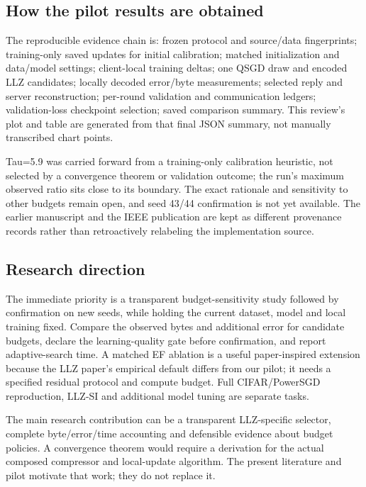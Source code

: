 \subsection*{How the pilot results are obtained}

The reproducible evidence chain is: frozen protocol and source/data fingerprints; training-only saved updates for initial calibration; matched initialization and data/model settings; client-local training deltas; one QSGD draw and encoded LLZ candidates; locally decoded error/byte measurements; selected reply and server reconstruction; per-round validation and communication ledgers; validation-loss checkpoint selection; saved comparison summary. This review's plot and table are generated from that final JSON summary, not manually transcribed chart points.

Tau=5.9 was carried forward from a training-only calibration heuristic, not selected by a convergence theorem or validation outcome; the run's maximum observed ratio sits close to its boundary. The exact rationale and sensitivity to other budgets remain open, and seed 43/44 confirmation is not yet available. The earlier manuscript and the IEEE publication are kept as different provenance records rather than retroactively relabeling the implementation source. \parencite{cao2026llzmanuscript,cao2026llz}

\subsection*{Research direction}

The immediate priority is a transparent budget-sensitivity study followed by confirmation on new seeds, while holding the current dataset, model and local training fixed. Compare the observed bytes and additional error for candidate budgets, declare the learning-quality gate before confirmation, and report adaptive-search time. A matched EF ablation is a useful paper-inspired extension because the LLZ paper's empirical default differs from our pilot; it needs a specified residual protocol and compute budget. Full CIFAR/PowerSGD reproduction, LLZ-SI and additional model tuning are separate tasks.

The main research contribution can be a transparent LLZ-specific selector, complete byte/error/time accounting and defensible evidence about budget policies. A convergence theorem would require a derivation for the actual composed compressor and local-update algorithm. The present literature and pilot motivate that work; they do not replace it.
